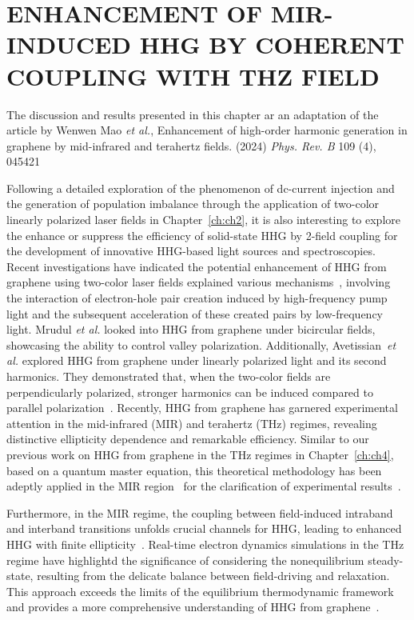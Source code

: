 \chapter{ENHANCEMENT OF MIR-INDUCED HHG BY COHERENT COUPLING WITH THZ FIELD \label{ch:ch5}}
The discussion and results presented in this chapter ar an adaptation of the article by Wenwen Mao \emph{et al.}, Enhancement of high-order harmonic generation in graphene by mid-infrared and terahertz fields. (2024) {\it Phys. Rev. B} 109 (4), 045421

Following a detailed exploration of the phenomenon of dc-current injection and the generation of population imbalance through the application of two-color linearly polarized laser fields in Chapter~\ref{ch:ch2}, it is also interesting to explore the enhance or suppress the efficiency of solid-state \gls{HHG} by 2-field coupling for the development of innovative HHG-based light sources and spectroscopies. Recent investigations have indicated the potential enhancement of HHG from graphene using two-color laser fields explained various mechanisms~\cite{PhysRevB.100.035434,Mrudul:21,PhysRevB.105.195405}, involving the interaction of electron-hole pair creation induced by high-frequency pump light and the subsequent acceleration of these created pairs by low-frequency light. Mrudul \textit{et al.} looked into HHG from graphene under bicircular fields, showcasing the ability to control valley polarization\cite{Mrudul:21}. Additionally, Avetissian~\textit{et al.} explored HHG from graphene under linearly polarized light and its second harmonics. They demonstrated that, when the two-color fields are perpendicularly polarized, stronger harmonics can be induced compared to parallel polarization~\cite{PhysRevB.105.195405}.
Recently, \gls{HHG} from graphene has garnered experimental attention in the mid-infrared (MIR)\cite{doi:10.1126/science.aam8861,cha2022gate} and terahertz (THz)\cite{Hafez2018,doi:10.1126/sciadv.abf9809} regimes, revealing distinctive ellipticity dependence and remarkable efficiency. Similar to our previous work on HHG from graphene in the THz regimes in Chapter~\ref{ch:ch4}, based on a quantum master equation, this theoretical methodology has been adeptly applied in the MIR region~\cite{PhysRevB.103.L041408} for the clarification of experimental results~\cite{doi:10.1126/science.aam8861,cha2022gate}.

Furthermore, in the MIR regime, the coupling between field-induced intraband and interband transitions unfolds crucial channels for HHG, leading to enhanced HHG with finite ellipticity~\cite{PhysRevB.103.L041408}. Real-time electron dynamics simulations in the THz regime have highlightd the significance of considering the nonequilibrium steady-state, resulting from the delicate balance between field-driving and relaxation. This approach exceeds the limits of the equilibrium thermodynamic framework and provides a more comprehensive understanding of HHG from graphene~\cite{PhysRevB.106.024313}.

